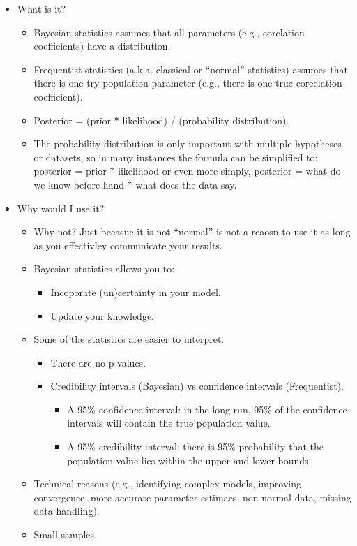 \documentclass[
  a4paper,
  DIV=11,
  numbers=noendperiod]{scrreprt}
\providecommand{\tightlist}{%
  \setlength{\itemsep}{0pt}\setlength{\parskip}{0pt}}\usepackage{longtable,booktabs,array}
\begin{document}
\begin{itemize}
\tightlist
\item
  What is it?

  \begin{itemize}
  \tightlist
  \item
    Bayesian statistics assumes that all parameters (e.g., corelation
    coefficients) have a distribution.
  \item
    Frequentist statistics (a.k.a. classical or ``normal'' statistics)
    assumes that there is one try population parameter (e.g., there is
    one true coreelation coefficient).
  \item
    Posterior = (prior * likelihood) / (probability distribution).
  \item
    The probability distribution is only important with multiple
    hypotheses or datasets, so in many instances the formula can be
    simplified to: posterior = prior * likelihood or even more simply,
    posterior = what do we know before hand * what does the data say.
  \end{itemize}
\item
  Why would I use it?

  \begin{itemize}
  \tightlist
  \item
    Why not? Just becasue it is not ``normal'' is not a reaosn to use it
    as long as you effectivley communicate your results.
  \item
    Bayesian statistics allows you to:

    \begin{itemize}
    \tightlist
    \item
      Incoporate (un)certainty in your model.
    \item
      Update your knowledge.
    \end{itemize}
  \item
    Some of the statistics are easier to interpret.

    \begin{itemize}
    \tightlist
    \item
      There are no p-values.
    \item
      Credibility intervals (Bayesian) vs confidence intervals
      (Frequentist).

      \begin{itemize}
      \tightlist
      \item
        A 95\% confidence interval: in the long run, 95\% of the
        confidence intervals will contain the true population value.
      \item
        A 95\% credibility interval: there is 95\% probability that the
        population value lies within the upper and lower bounds.
      \end{itemize}
    \end{itemize}
  \item
    Technical reasons (e.g., identifying complex models, improving
    convergence, more accurate parameter estimaes, non-normal data,
    missing data handling).
  \item
    Small samples.


\end{itemize}
\end{itemize}
\end{document}
